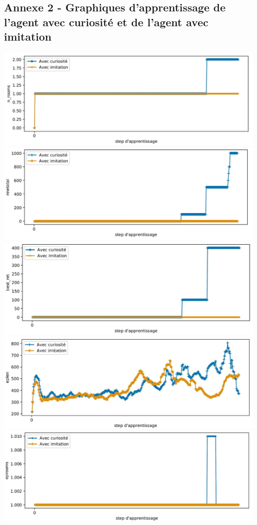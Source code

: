 \documentclass[a4paper,12pt]{report}
\begin{document}
\subsection*{Annexe 2 - Graphiques d'apprentissage de l'agent avec curiosité et de l'agent avec imitation}
\label{annexe_2}
    \centering
    \includegraphics[width=\textwidth]{curiosity_imitation/curiosity_imitation_n_rooms.JPG}
    \includegraphics[width=\textwidth]{curiosity_imitation/curiosity_imitation_rewtotal.JPG}
    \includegraphics[width=\textwidth]{curiosity_imitation/curiosity_imitation_best_ret.JPG}
    \includegraphics[width=\textwidth]{curiosity_imitation/curiosity_imitation_eplen.JPG}
    \includegraphics[width=\textwidth]{curiosity_imitation/curiosity_imitation_eprooms.JPG}
\end{document}
